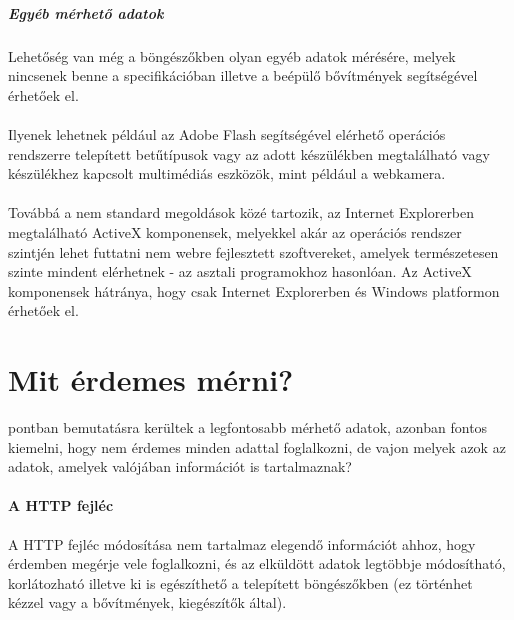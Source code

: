\subparagraph{Egyéb mérhető adatok} %
\label{subp:egyéb_mérhető_adatok}
Lehetőség van még a böngészőkben olyan egyéb adatok mérésére, melyek nincsenek benne a specifikációban illetve a beépülő bővítmények segítségével érhetőek el.\hfill\\\\
Ilyenek lehetnek például az Adobe Flash segítségével elérhető operációs rendszerre telepített betűtípusok vagy az adott készülékben megtalálható vagy készülékhez kapcsolt multimédiás eszközök, mint például a webkamera.\hfill\\\\
Továbbá a nem standard megoldások közé tartozik, az Internet Explorerben megtalálható ActiveX komponensek, melyekkel akár az operációs rendszer szintjén lehet futtatni nem webre fejlesztett szoftvereket, amelyek természetesen szinte mindent elérhetnek - az asztali programokhoz hasonlóan. Az ActiveX komponensek hátránya, hogy csak Internet Explorerben és Windows platformon érhetőek el.



\section{Mit érdemes mérni?} %
\label{sec:mit_erdemes_merni_}

 pontban bemutatásra kerültek a legfontosabb mérhető adatok, azonban fontos kiemelni, hogy nem érdemes minden adattal foglalkozni, de vajon melyek azok az adatok, amelyek valójában információt is tartalmaznak?\hfill\\

\paragraph{A HTTP fejléc} %
\label{par:a_http_fejléc}
A HTTP fejléc módosítása nem tartalmaz elegendő információt ahhoz, hogy érdemben megérje vele foglalkozni, és az elküldött adatok legtöbbje módosítható, korlátozható illetve ki is egészíthető a telepített böngészőkben (ez történhet kézzel vagy a bővítmények, kiegészítők által).

